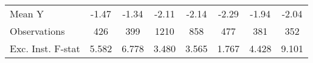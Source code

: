 {\begin{tabular}{l*{7}{c}}
\midrule
Mean Y      &       -1.47         &       -1.34         &       -2.11         &       -2.14         &       -2.29         &       -1.94         &       -2.04         \\
Observations&         426         &         399         &        1210         &         858         &         477         &         381         &         352         \\
Exc. Inst. F-stat&       5.582         &       6.778         &       3.480         &       3.565         &       1.767         &       4.428         &       9.101         \\
\bottomrule
\end{tabular}
}

